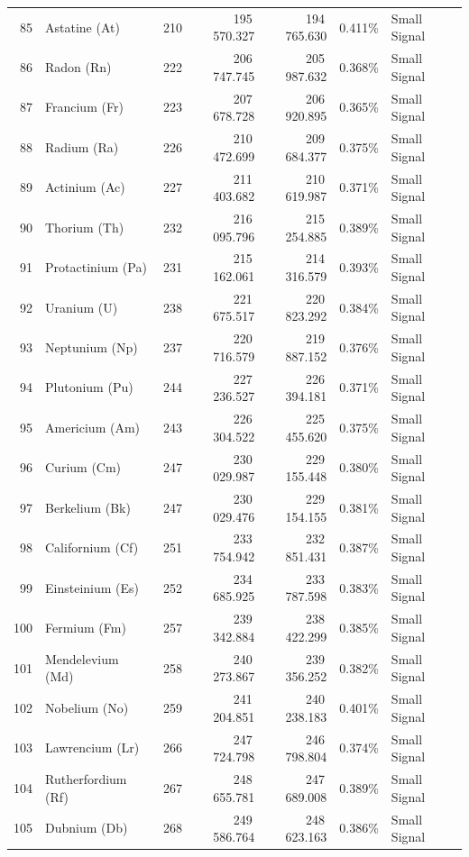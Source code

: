 \begin{footnotesize}
\begin{longtable}{r l r r r r p{3.5cm}}
85 & Astatine (At)     & 210 & 195\,570.327 & 194\,765.630 & 0.411\% & Small Signal \\
86 & Radon (Rn)        & 222 & 206\,747.745 & 205\,987.632 & 0.368\% & Small Signal \\
\midrule
87 & Francium (Fr)     & 223 & 207\,678.728 & 206\,920.895 & 0.365\% & Small Signal \\
88 & Radium (Ra)       & 226 & 210\,472.699 & 209\,684.377 & 0.375\% & Small Signal \\
89 & Actinium (Ac)     & 227 & 211\,403.682 & 210\,619.987 & 0.371\% & Small Signal \\
90 & Thorium (Th)      & 232 & 216\,095.796 & 215\,254.885 & 0.389\% & Small Signal \\
91 & Protactinium (Pa) & 231 & 215\,162.061 & 214\,316.579 & 0.393\% & Small Signal \\
92 & Uranium (U)       & 238 & 221\,675.517 & 220\,823.292 & 0.384\% & Small Signal \\
93 & Neptunium (Np)    & 237 & 220\,716.579 & 219\,887.152 & 0.376\% & Small Signal \\
94 & Plutonium (Pu)    & 244 & 227\,236.527 & 226\,394.181 & 0.371\% & Small Signal \\
95 & Americium (Am)    & 243 & 226\,304.522 & 225\,455.620 & 0.375\% & Small Signal \\
96 & Curium (Cm)       & 247 & 230\,029.987 & 229\,155.448 & 0.380\% & Small Signal \\
97 & Berkelium (Bk)    & 247 & 230\,029.476 & 229\,154.155 & 0.381\% & Small Signal \\
98 & Californium (Cf)  & 251 & 233\,754.942 & 232\,851.431 & 0.387\% & Small Signal \\
99 & Einsteinium (Es)  & 252 & 234\,685.925 & 233\,787.598 & 0.383\% & Small Signal \\
100 & Fermium (Fm)     & 257 & 239\,342.884 & 238\,422.299 & 0.385\% & Small Signal \\
101 & Mendelevium (Md) & 258 & 240\,273.867 & 239\,356.252 & 0.382\% & Small Signal \\
102 & Nobelium (No)    & 259 & 241\,204.851 & 240\,238.183 & 0.401\% & Small Signal \\
103 & Lawrencium (Lr)  & 266 & 247\,724.798 & 246\,798.804 & 0.374\% & Small Signal \\
104 & Rutherfordium (Rf) & 267 & 248\,655.781 & 247\,689.008 & 0.389\% & Small Signal \\
105 & Dubnium (Db)     & 268 & 249\,586.764 & 248\,623.163 & 0.386\% & Small Signal \\

\end{longtable}
\end{footnotesize}
